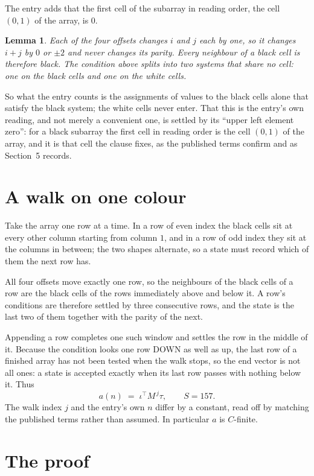 \documentclass[11pt,a4paper]{article}
\theoremstyle{plain}
\newtheorem{lemma}[theorem]{Lemma}
\theoremstyle{definition}
\begin{document}
The entry adds that the first cell of the subarray in reading order, the cell $(0,1)$ of the array, is $0$.

\begin{lemma}\label{lem:split}
Each of the four offsets changes $i$ and $j$ each by one, so it changes $i+j$ by $0$ or $\pm2$
and never changes its parity. Every neighbour of a black cell is therefore black. The condition
above splits into two systems that share no cell: one on the black cells and one on the white
cells.
\end{lemma}

So what the entry counts is the assignments of values to the black cells alone that satisfy the
black system; the white cells never enter. That this is the entry's own reading, and not
merely a convenient one, is settled by its ``upper left element zero'': for a black subarray the
first cell in reading order is the cell $(0,1)$ of the array, and it is that cell the
clause fixes, as the published terms confirm and as Section~5 records.

\section{A walk on one colour}

Take the array one row at a time. In a row of even index the black cells sit at every other
column starting from column $1$, and in a row of odd index they sit at the columns in
between; the two shapes alternate, so a state must record which of them the next row has.

All four offsets move exactly one row, so the neighbours of the black cells of a row are the
black cells of the rows immediately above and below it. A row's conditions are therefore settled
by three consecutive rows, and the state is the last two of them together with the parity of the
next.

Appending a row completes one such window and settles the row in the middle of it. Because the
condition looks one row DOWN as well as up, the last row of a finished array has not been tested
when the walk stops, so the end vector is not all ones: a state is accepted exactly when its
last row passes with nothing below it. Thus
\[
a(n)\;=\;\iota^{\!\top}M^{\,j}\tau ,\qquad S=157.
\]
The walk index $j$ and the entry's own $n$ differ by a constant, read off by matching the
published terms rather than assumed. In particular $a$ is $C$-finite.

\section{The proof}
\end{document}
